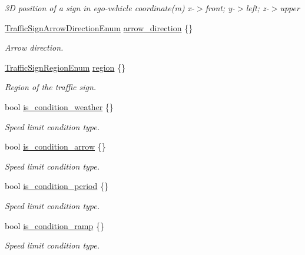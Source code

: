 \begin{DoxyCompactItemize}
\begin{DoxyCompactList}\small\item\em 3D position of a sign in ego-\/vehicle coordinate(m) x-\/$>$front; y-\/$>$left; z-\/$>$upper \end{DoxyCompactList}\item 
\hyperlink{structmaf__perception__interface_1_1TrafficSignArrowDirectionEnum}{Traffic\+Sign\+Arrow\+Direction\+Enum} \hyperlink{structmaf__perception__interface_1_1TrafficSign_ada4b7d66fb86b28ecb1c8160ee8203f5}{arrow\+\_\+direction} \{\}
\begin{DoxyCompactList}\small\item\em Arrow direction. \end{DoxyCompactList}\item 
\hyperlink{structmaf__perception__interface_1_1TrafficSignRegionEnum}{Traffic\+Sign\+Region\+Enum} \hyperlink{structmaf__perception__interface_1_1TrafficSign_a39886b005257e582e5cbf8ea160dd8a6}{region} \{\}
\begin{DoxyCompactList}\small\item\em Region of the traffic sign. \end{DoxyCompactList}\item 
bool \hyperlink{structmaf__perception__interface_1_1TrafficSign_aaa7922686efb04d5669d6b2ddab4edff}{is\+\_\+condition\+\_\+weather} \{\}
\begin{DoxyCompactList}\small\item\em Speed limit condition type. \end{DoxyCompactList}\item 
bool \hyperlink{structmaf__perception__interface_1_1TrafficSign_af377a044be68f568136f83ef8523152e}{is\+\_\+condition\+\_\+arrow} \{\}
\begin{DoxyCompactList}\small\item\em Speed limit condition type. \end{DoxyCompactList}\item 
bool \hyperlink{structmaf__perception__interface_1_1TrafficSign_accc48956fbeec753cafe229c6503b7db}{is\+\_\+condition\+\_\+period} \{\}
\begin{DoxyCompactList}\small\item\em Speed limit condition type. \end{DoxyCompactList}\item 
bool \hyperlink{structmaf__perception__interface_1_1TrafficSign_a01f21104464bf8be6ba64e80c7d4cbe1}{is\+\_\+condition\+\_\+ramp} \{\}
\begin{DoxyCompactList}\small\item\em Speed limit condition type. \end{DoxyCompactList}\item 

\end{DoxyCompactItemize}
